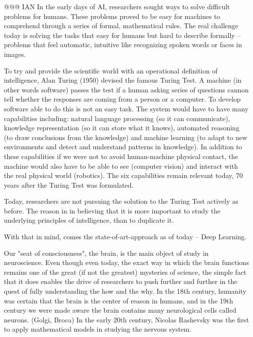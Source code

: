 \documentclass[b5paper]{book}
\begin{document}
@@@ IAN
In the early days of AI, researchers sought ways to solve difficult problems for humans. These problems proved to be easy for machines to comprehend through a series of formal, mathematical rules. The real challenge today is solving the tasks that easy for humans but hard to describe formally -- problems that feel automatic, intuitive like recognizing spoken words or faces in images.

To try and provide the scientific world with an operational definition of intelligence, Alan Turing (1950) devised the famous Turing Test. A machine (in other words software) passes the test if a human asking series of questions cannon tell whether the responses are coming from a person or a computer. To develop software able to do this is not an easy task. The system would have to have many capabilities including: natural language processing (so it can communicate), knowledge representation (so it can store what it knows), automated reasoning (to draw conclusions from the knowledge) and machine learning (to adapt to new environments and detect and understand patterns in knowledge). In addition to these capabilities if we were not to avoid human-machine physical contact, the machine would also have to be able to see (computer vision) and interact with the real physical world (robotics). The six capabilities remain relevant today, 70 years after the Turing Test was formulated.

Today, researchers are not pursuing the solution to the Turing Test actively as before. The reason in in believing that it is more important to study the underlying principles of intelligence, than to duplicate it. 

With that in mind, comes the state-of-art-approach as of today -- Deep Learning.

Our "seat of consciousness", the brain, is the main object of study in neuroscience. Even though even today, the exact way in which the brain functions remains one of the great (if not the greatest) mysteries of science, the simple fact that it does enables the drive of researchers to push further and further in the quest of fully understanding the how and the why. In the 18th century, humanity was certain that the brain is the center of reason in humans, and in the 19th century we were made aware the brain contains many neurological cells called neurons. (Golgi, Broca) In the early 20th century, Nicolas Rashevsky was the first to apply mathematical models in studying the nervous system. 
\end{document}
